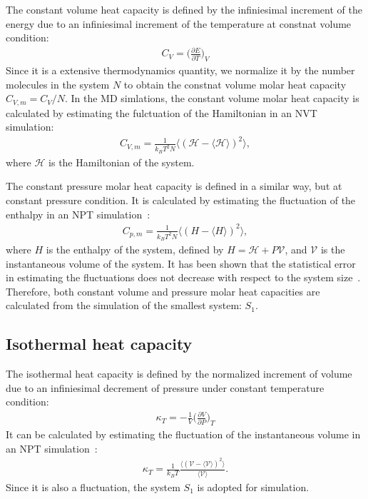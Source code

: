\documentclass[aip,jcp,a4paper,preprint,unsortedaddress,onecolumn,fleqn]{revtex4-1}
\newcommand{\systemsb}{S_1}
\begin{document}
The constant volume heat capacity is defined by the infiniesimal
increment of the energy due to an infiniesimal increment of the temperature
at constnat volume condition: 
\begin{align}
  C_V = \Big(\frac{\partial E}{\partial T}\Big)_V
\end{align}
Since it is a extensive thermodynamics quantity, we  normalize
it by the number molecules in the system $N$ to obtain the
constnat volume molar heat capacity $C_{V,m} = C_V/N$.
In the MD simlations, 
the constant volume molar heat capacity is calculated by estimating the
fulctuation of the Hamiltonian in an NVT simulation:
\begin{align}
  C_{V,m} = \frac{1}{k_BT^2 N} \langle (\mathcal H - \langle\mathcal H\rangle)^2 \rangle,
\end{align}
where $\mathcal H$ is the 
Hamiltonian of the system. 

The constant pressure molar heat capacity is defined in
a similar way, but at constant pressure
condition. 
It is calculated by estimating
the fluctuation of the enthalpy in an NPT simulation~\cite{wang2011existence}:
\begin{align}
  C_{p,m} = \frac{1}{k_BT^2 N} \langle ( H - \langle H\rangle)^2 \rangle,
\end{align}
where $ H$ is the enthalpy of the system,
defined by $H = \mathcal H + P\mathcal V$, and $\mathcal V$ is the instantaneous volume
of the system.
It has been shown that the statistical error in estimating
the fluctuations does not decrease with
respect to the system size~\cite{milchev1986fluctuations,ferrenberg1991statistical}.
Therefore, both constant volume and pressure molar heat capacities
are calculated from the simulation of the smallest system: $\systemsb$.

\subsection{Isothermal heat capacity}
The isothermal heat capacity is defined
by the normalized increment of volume due to an infiniesimal
decrement of pressure under constant temperature condition:
\begin{align}
  \kappa_T = - \frac 1V \Big(\frac{\partial V}{\partial P}\Big)_T
\end{align}
It can be calculated by estimating the fluctuation
of the instantaneous volume in an NPT simulation~\cite{wang2011existence}:
\begin{align}
  \kappa_T = \frac{1}{k_BT} \frac{\langle (\mathcal V - \langle \mathcal V\rangle)^2 \rangle}{\langle \mathcal V\rangle}.
\end{align}
Since it is also a fluctuation, the system $\systemsb$ is adopted for simulation.
\end{document}
